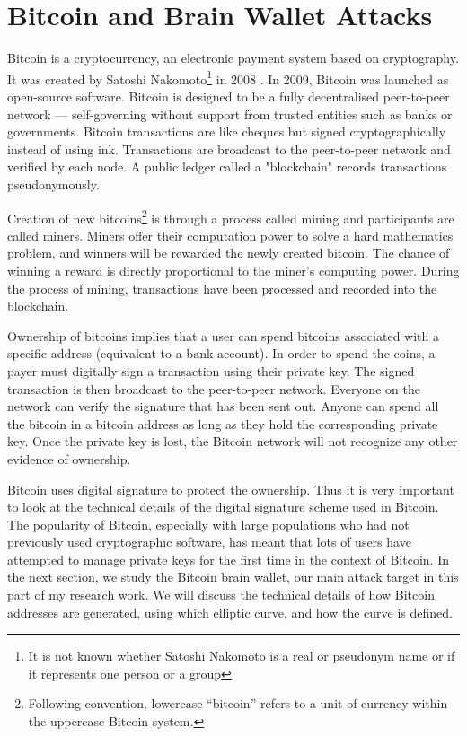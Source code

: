 \section{Bitcoin and Brain Wallet Attacks}
Bitcoin is a cryptocurrency, an electronic payment system based on cryptography. It was created by Satoshi Nakomoto\footnote{It is not known whether Satoshi Nakomoto is a real or pseudonym name or if it represents one person or a group} in 2008 \cite{nakamoto2008bitcoin}. In 2009, Bitcoin was launched as open-source software. Bitcoin is designed to be a fully decentralised peer-to-peer network --- self-governing without support from trusted entities such as banks or governments. Bitcoin transactions are like cheques but signed cryptographically instead of using ink. Transactions are broadcast to the peer-to-peer network and verified by each node. A public ledger called a "blockchain" records transactions pseudonymously.

Creation of new bitcoins\footnote{Following convention, lowercase ``bitcoin'' refers to a unit of currency within the uppercase Bitcoin system.} is through a process called mining and participants are called miners. Miners offer their computation power to solve a hard mathematics problem, and winners will be rewarded the newly created bitcoin. The chance of winning a reward is directly proportional to the miner's computing power. During the process of mining, transactions have been processed and recorded into the blockchain. 

Ownership of bitcoins implies that a user can spend bitcoins associated with a specific address (equivalent to a bank account). In order to spend the coins, a payer must digitally sign a transaction using their private key. The signed transaction is then broadcast to the peer-to-peer network. Everyone on the network can verify the signature that has been sent out. Anyone can spend all the bitcoin in a bitcoin address as long as they hold the corresponding private key. Once the private key is lost, the Bitcoin network will not recognize any other evidence of ownership.

Bitcoin uses digital signature to protect the ownership. Thus it is very important to look at the technical details of the digital signature scheme used in Bitcoin. The popularity of Bitcoin, especially with large populations who had not previously used cryptographic software, has meant that lots of users have attempted to manage private keys for the first time in the context of Bitcoin. In the next section, we study the Bitcoin brain wallet, our main attack target in this part of my research work. We will discuss the technical details of how Bitcoin addresses are generated, using which elliptic curve, and how the curve is defined.


